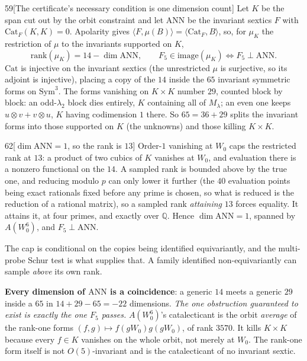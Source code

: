 \begin{Lem}{59}[The certificate's necessary condition is one dimension count]
Let $K$ be the span cut out by the orbit constraint and let $\mathrm{ANN}$ be the invariant sextics $F$ with $\mathrm{Cat}_F(K,K)=0$. Apolarity gives $\langle F,\mu(B)\rangle=\langle\mathrm{Cat}_F,B\rangle$, so, for $\mu_K$ the restriction of $\mu$ to the invariants supported on $K$,
\[
\mathrm{rank}(\mu_K)=14-\dim\mathrm{ANN},\qquad F_5\in\mathrm{image}(\mu_K)\iff F_5\perp\mathrm{ANN}.
\]
$\mathrm{Cat}$ is injective on the invariant sextics (the unrestricted $\mu$ is surjective, so its adjoint is injective), placing a copy of the $14$ inside the $65$ invariant symmetric forms on $\mathrm{Sym}^3$. The forms vanishing on $K\times K$ number $29$, counted block by block: an odd-$\lambda_2$ block dies entirely, $K$ containing all of $M_\lambda$; an even one keeps $u\otimes v+v\otimes u$, $K$ having codimension $1$ there. So $65=36+29$ splits the invariant forms into those supported on $K$ (the unknowns) and those killing $K\times K$.
\end{Lem}

\begin{Lem}{62}[$\dim\mathrm{ANN}=1$, so the rank is $13$]
Order-$1$ vanishing at $W_0$ caps the restricted rank at $13$: a product of two cubics of $K$ vanishes at $W_0$, and evaluation there is a nonzero functional on the $14$. A sampled rank is bounded above by the true one, and reducing modulo $p$ can only lower it further (the $40$ evaluation points being exact rationals fixed before any prime is chosen, so what is reduced is the reduction of a rational matrix), so a sampled rank \emph{attaining} $13$ forces equality. It attains it, at four primes, and exactly over $\mathbb Q$. Hence $\dim\mathrm{ANN}=1$, spanned by $A(W_0^6)$, and $F_5\perp\mathrm{ANN}$.
\end{Lem}

\noindent The cap is conditional on the copies being identified equivariantly, and the multi-probe Schur test is what supplies that. A family identified non-equivariantly can sample \emph{above} its own rank.

\noindent\textbf{Every dimension of $\mathrm{ANN}$ is a coincidence}: a generic $14$ meets a generic $29$ inside a $65$ in $14+29-65=-22$ dimensions. \emph{The one obstruction guaranteed to exist is exactly the one $F_5$ passes.} $A(W_0^6)$'s catalecticant is the orbit \emph{average} of the rank-one forms $(f,g)\mapsto f(gW_0)g(gW_0)$, of rank $3570$. It kills $K\times K$ because every $f\in K$ vanishes on the whole orbit, not merely at $W_0$. The rank-one form itself is not $O(5)$-invariant and is the catalecticant of no invariant sextic.

